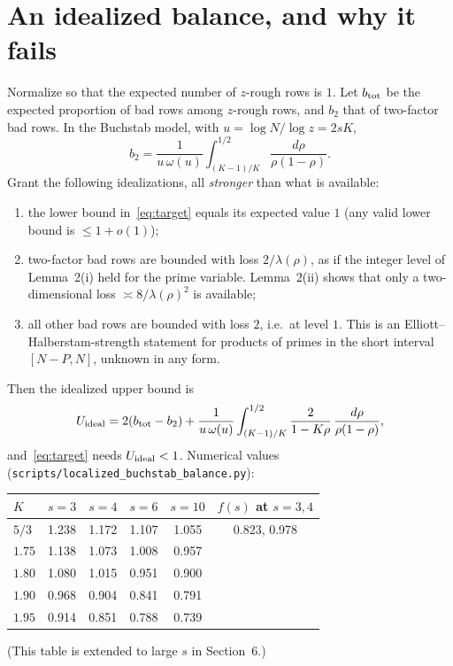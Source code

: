 \documentclass[11pt,a4paper]{article}
\theoremstyle{remark}
\begin{document}
\section{An idealized balance, and why it fails}
Normalize so that the expected number of $z$-rough rows is $1$. Let $b_{\rm tot}$ be the expected
proportion of bad rows among $z$-rough rows, and $b_2$ that of two-factor bad rows. In the
Buchstab model, with $u=\log N/\log z=2sK$,
\[
b_2=\frac1{u\,\omega(u)}\int_{(K-1)/K}^{1/2}\frac{d\rho}{\rho(1-\rho)} .
\]
Grant the following idealizations, all \emph{stronger} than what is available:
\begin{enumerate}
\item[(I1)] the lower bound in~\eqref{eq:target} equals its expected value $1$ (any valid lower
bound is $\le1+o(1)$);
\item[(I2)] two-factor bad rows are bounded with loss $2/\lambda(\rho)$, as if the integer level of
Lemma~2(i) held for the prime variable. Lemma~2(ii) shows that only a two-dimensional loss
$\asymp8/\lambda(\rho)^2$ is available;
\item[(I3)] all other bad rows are bounded with loss $2$, i.e.\ at level $1$. This is an
Elliott--Halberstam-strength statement for products of primes in the short interval $[N-P,N]$,
unknown in any form.
\end{enumerate}
Then the idealized upper bound is
\[
U_{\rm ideal}=2(b_{\rm tot}-b_2)+\frac1{u\,\omega(u)}\int_{(K-1)/K}^{1/2}\frac{2}{1-K\rho}\,
\frac{d\rho}{\rho(1-\rho)},
\]
and~\eqref{eq:target} needs $U_{\rm ideal}<1$. Numerical values
(\texttt{scripts/localized\_buchstab\_balance.py}):
\begin{center}
\begin{tabular}{@{}lccccc@{}}
\toprule
$K$ & $s=3$ & $s=4$ & $s=6$ & $s=10$ & $f(s)$ at $s=3,4$\\
\midrule
$5/3$ & 1.238 & 1.172 & 1.107 & 1.055 & 0.823, 0.978\\
$1.75$ & 1.138 & 1.073 & 1.008 & 0.957 & \\
$1.80$ & 1.080 & 1.015 & 0.951 & 0.900 & \\
$1.90$ & 0.968 & 0.904 & 0.841 & 0.791 & \\
$1.95$ & 0.914 & 0.851 & 0.788 & 0.739 & \\
\bottomrule
\end{tabular}
\end{center}

(This table is extended to large $s$ in Section~6.)
\end{document}
